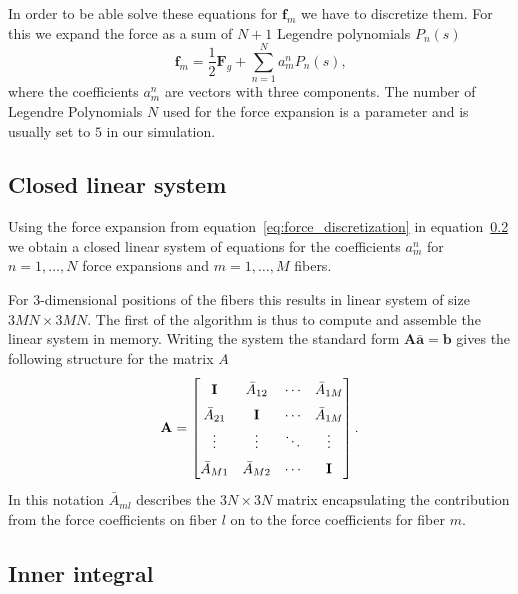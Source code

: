 \documentclass[a4paper,11pt]{kth-mag}
\begin{document}
In order to be able solve these equations for $\mathbf{f}_m$ we have to discretize them. For this we expand the force as a sum of $N+1$ Legendre polynomials $P_n(s)$
\begin{equation}
  \label{eq:force_discretization}
  \mathbf{f}_m = \frac{1}{2}\mathbf{F}_g + \sum_{n=1}^{N}a_{m}^{n} P_n(s) \text{,}
\end{equation}
where the coefficients $a_{m}^{n}$ are vectors with three components. The number of Legendre Polynomials $N$ used for the force expansion is a parameter and is usually set to $5$ in our simulation.

\subsection{Closed linear system}

Using the force expansion from equation~\ref{eq:force_discretization} in equation~\ref{} we obtain a closed linear system of equations for the coefficients $a_{m}^{n}$ for $n=1,\dots,N$ force expansions and $m = 1,\dots,M$ fibers.

For 3-dimensional positions of the fibers this results in linear system of size $3MN\times3MN$. The first of the algorithm is thus to compute and assemble the linear system in memory. Writing the system the standard form $\mathbf{A}\mathbf{\bar{a}}=\mathbf{b}$ gives the following structure for the matrix $A$
\begin{equation}
  \label{eq:matrix_structure}
  \renewcommand\arraystretch{1.5}
  \mathbf{A} =
  \begin{bmatrix}
    \mathbf{I} & \bar{A}_{12} & \cdots & \bar{A}_{1M} \\
    \bar{A}_{21} & \mathbf{I} & \cdots & \bar{A}_{1M} \\
    \vdots & \vdots & \ddots & \vdots \\
    \bar{A}_{M1} & \bar{A}_{M2} & \cdots & \mathbf{I}
  \end{bmatrix} \text{.}
\end{equation}
In this notation $\bar{A}_{ml}$ describes the $3N\times3N$ matrix encapsulating the contribution from the force coefficients on fiber $l$ on to the force coefficients for fiber $m$.

\subsection{Inner integral}
\end{document}
